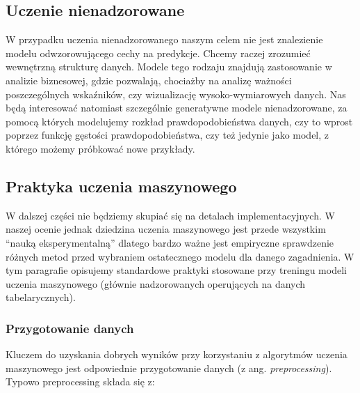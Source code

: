 \documentclass{myclass}
\numberwithin{equation}{subsection}
\begin{document}
\subsection{Uczenie nienadzorowane}

W przypadku uczenia nienadzorowanego naszym celem nie jest znalezienie modelu odwzorowującego cechy
na predykcje. Chcemy raczej zrozumieć wewnętrzną strukturę danych. Modele tego rodzaju znajdują
zastosowanie w analizie biznesowej, gdzie pozwalają, chociażby na analizę ważności poszczególnych
wskaźników, czy wizualizację wysoko-wymiarowych danych. Nas będą interesować natomiast szczególnie
generatywne modele nienadzorowane, za pomocą których modelujemy rozkład prawdopodobieństwa danych,
czy to wprost poprzez funkcję gęstości prawdopodobieństwa, czy też jedynie jako model, z którego
możemy próbkować nowe przykłady.


\subsection{Praktyka uczenia maszynowego}

W dalszej części nie będziemy skupiać się na detalach implementacyjnych. W naszej ocenie jednak
dziedzina uczenia maszynowego jest przede wszystkim \enquote{nauką eksperymentalną} dlatego bardzo
ważne jest empiryczne sprawdzenie różnych metod przed wybraniem ostatecznego modelu dla danego
zagadnienia. W tym paragrafie opisujemy standardowe praktyki stosowane przy treningu modeli uczenia
maszynowego (głównie nadzorowanych operujących na danych tabelarycznych).


\subsubsection{Przygotowanie danych}

Kluczem do uzyskania dobrych wyników przy korzystaniu z algorytmów uczenia maszynowego jest
odpowiednie przygotowanie danych (z ang. \textit{preprocessing}). Typowo preprocessing składa się z:
\end{document}
